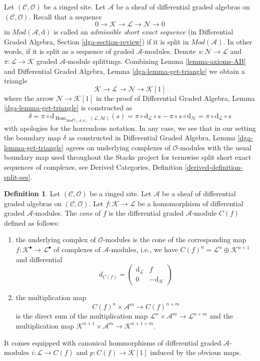 \documentclass{stacks-project}
\theoremstyle{plain}
\theoremstyle{definition}
\newtheorem{definition}[subsection]{Definition}
\theoremstyle{remark}
\numberwithin{equation}{subsection}
\def\Hom{\mathop{\mathrm{Hom}}\nolimits}
\begin{document}
\noindent
Let $(\mathcal{C}, \mathcal{O})$ be a ringed site.
Let $\mathcal{A}$ be a sheaf of differential graded algebras
on $(\mathcal{C}, \mathcal{O})$.
Recall that a sequence
$$
0 \to \mathcal{K} \to \mathcal{L} \to \mathcal{N} \to 0
$$
in $\textit{Mod}(\mathcal{A}, \text{d})$
is called an {\it admissible short exact sequence}
(in Differential Graded Algebra, Section \ref{dga-section-review})
if it is split in $\textit{Mod}(\mathcal{A})$. In other words, if it is split
as a sequence of graded $\mathcal{A}$-modules. Denote
$s : \mathcal{N} \to \mathcal{L}$ and
$\pi : \mathcal{L} \to \mathcal{K}$
graded $\mathcal{A}$-module splittings.
Combining Lemma \ref{lemma-axioms-AB} and 
Differential Graded Algebra, Lemma \ref{dga-lemma-get-triangle}
we obtain a triangle
$$
\mathcal{K} \to \mathcal{L} \to \mathcal{N} \to \mathcal{K}[1]
$$
where the arrow $\mathcal{N} \to \mathcal{K}[1]$ in the proof
of Differential Graded Algebra, Lemma \ref{dga-lemma-get-triangle}
is constructed as
$$
\delta = \pi \circ
\text{d}_{\Hom_{\textit{Mod}^{dg}(\mathcal{A}, \text{d})}
(\mathcal{L}, \mathcal{M})}(s) =
\pi \circ \text{d}_\mathcal{L} \circ s -
\pi \circ s \circ \text{d}_\mathcal{N} =
\pi \circ \text{d}_\mathcal{L} \circ s
$$
with apologies for the horrendous notation. In any case, we see that
in our setting the boundary map $\delta$ as constructed in
Differential Graded Algebra, Lemma \ref{dga-lemma-get-triangle}
agrees on underlying complexes of $\mathcal{O}$-modules
with the usual boundary map used throughout the Stacks project
for termwise split short exact sequences of complexes, see
Derived Categories, Definition \ref{derived-definition-split-ses}.

\begin{definition}
\label{definition-cone}
Let $(\mathcal{C}, \mathcal{O})$ be a ringed site.
Let $\mathcal{A}$ be a sheaf of differential graded algebras
on $(\mathcal{C}, \mathcal{O})$.
Let $f : \mathcal{K} \to \mathcal{L}$
be a homomorphism of differential graded $\mathcal{A}$-modules.
The {\it cone} of $f$ is the differential graded $\mathcal{A}$-module
$C(f)$ defined as follows:
\begin{enumerate}
\item the underlying complex of $\mathcal{O}$-modules
is the cone of the corresponding map
$f : \mathcal{K}^\bullet \to \mathcal{L}^\bullet$ of
complexes of $\mathcal{A}$-modules, i.e., we have
$C(f)^n = \mathcal{L}^n \oplus \mathcal{K}^{n + 1}$ and
differential
$$
d_{C(f)} =
\left(
\begin{matrix}
\text{d}_\mathcal{L} & f \\
0 & -\text{d}_\mathcal{K}
\end{matrix}
\right)
$$
\item the multiplication map
$$
C(f)^n \times \mathcal{A}^m \to C(f)^{n + m}
$$
is the direct sum of the multiplication map
$\mathcal{L}^n \times \mathcal{A}^m \to \mathcal{L}^{n + m}$
and the multiplication map
$\mathcal{K}^{n + 1} \times \mathcal{A}^m \to \mathcal{K}^{n + 1 + m}$.
\end{enumerate}
It comes equipped with canonical hommorphisms of differential graded
$\mathcal{A}$-modules $i : \mathcal{L} \to C(f)$
and $p : C(f) \to \mathcal{K}[1]$ induced by the obvious maps.
\end{definition}
\end{document}
